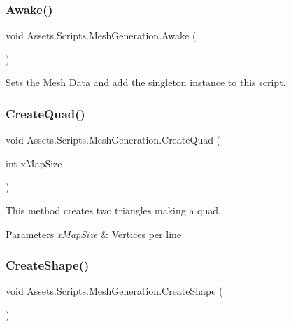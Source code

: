 \subsubsection{\texorpdfstring{Awake()}{Awake()}}
{\footnotesize\ttfamily void Assets.\+Scripts.\+Mesh\+Generation.\+Awake (\begin{DoxyParamCaption}{ }\end{DoxyParamCaption})\hspace{0.3cm}{\ttfamily [private]}}



Sets the Mesh Data and add the singleton instance to this script. 

\mbox{\label{class_assets_1_1_scripts_1_1_mesh_generation_a62d43347495810972a55224a8ff7a7a1}} 
\subsubsection{\texorpdfstring{CreateQuad()}{CreateQuad()}}
{\footnotesize\ttfamily void Assets.\+Scripts.\+Mesh\+Generation.\+Create\+Quad (\begin{DoxyParamCaption}\item[{int}]{x\+Map\+Size }\end{DoxyParamCaption})\hspace{0.3cm}{\ttfamily [private]}}



This method creates two triangles making a quad. 


\begin{DoxyParams}{Parameters}
{\em x\+Map\+Size} & Vertices per line\\
\hline
\end{DoxyParams}
\mbox{\label{class_assets_1_1_scripts_1_1_mesh_generation_aebf4b5f0cb1285927d7c44a03e98d78c}} 
\subsubsection{\texorpdfstring{CreateShape()}{CreateShape()}}
{\footnotesize\ttfamily void Assets.\+Scripts.\+Mesh\+Generation.\+Create\+Shape (\begin{DoxyParamCaption}{ }\end{DoxyParamCaption})}



